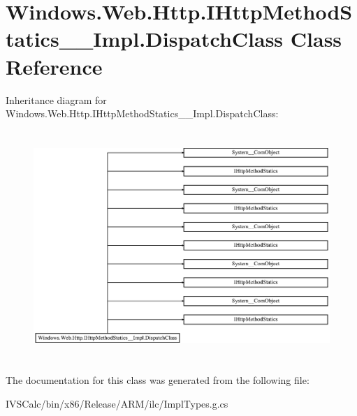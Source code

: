 \hypertarget{class_windows_1_1_web_1_1_http_1_1_i_http_method_statics_____impl_1_1_dispatch_class}{}\section{Windows.\+Web.\+Http.\+I\+Http\+Method\+Statics\+\_\+\+\_\+\+Impl.\+Dispatch\+Class Class Reference}
\label{class_windows_1_1_web_1_1_http_1_1_i_http_method_statics_____impl_1_1_dispatch_class}
Inheritance diagram for Windows.\+Web.\+Http.\+I\+Http\+Method\+Statics\+\_\+\+\_\+\+Impl.\+Dispatch\+Class\+:\begin{figure}[H]
\begin{center}
\leavevmode
\includegraphics[height=8.725213cm]{class_windows_1_1_web_1_1_http_1_1_i_http_method_statics_____impl_1_1_dispatch_class}
\end{center}
\end{figure}


The documentation for this class was generated from the following file\+:\begin{DoxyCompactItemize}
\item 
I\+V\+S\+Calc/bin/x86/\+Release/\+A\+R\+M/ilc/Impl\+Types.\+g.\+cs\end{DoxyCompactItemize}
